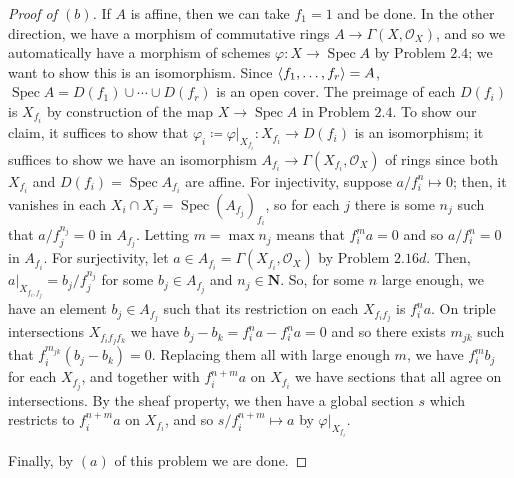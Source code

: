 \documentclass[12pt,letterpaper]{article}
\theoremstyle{definition}
\theoremstyle{remark}
\numberwithin{equation}{section}
\numberwithin{figure}{problem}
\DeclareMathOperator{\Spec}{Spec}
\DeclareMathOperator{\id}{id}
\newcommand{\OO}{\mathcal{O}}
\begin{document}
\begin{proof}[Proof of $(b)$]
  If $A$ is affine, then we can take $f_1 = 1$ and be done. In the other direction, we have a morphism of commutative rings $A \to \Gamma(X,\OO_X)$, and so we automatically have a morphism of schemes $\varphi\colon X \to \Spec A$ by Problem $2.4$; we want to show this is an isomorphism.
  Since $\braket{f_1,\ldots,f_r} = A$, $\Spec A = D(f_1) \cup \cdots \cup D(f_r)$ is an open cover. The preimage of each $D(f_i)$ is $X_{f_i}$ by construction of the map $X \to \Spec A$ in Problem $2.4$. To show our claim, it suffices to show that $\varphi_i \coloneqq \varphi\vert_{X_{f_i}}\colon X_{f_i} \to D(f_i)$ is an isomorphism; it suffices to show we have an isomorphism $A_{f_i} \to \Gamma(X_{f_i},\OO_X)$ of rings since both $X_{f_i}$ and $D(f_i) = \Spec A_{f_i}$ are affine. For injectivity, suppose $a/f_i^n \mapsto 0$; then, it vanishes in each $X_i \cap X_j = \Spec(A_{f_j})_{f_i}$, so for each $j$ there is some $n_j$ such that $a/f_j^{n_j} = 0$ in $A_{f_j}$. Letting $m = \max n_j$ means that $f_i^ma = 0$ and so $a/f_i^n = 0$ in $A_{f_i}$. For surjectivity, let $a \in A_{f_i} = \Gamma(X_{f_i},\OO_X)$ by Problem $2.16d$. Then, $a\vert_{X_{f_i,f_j}} = b_j/f_j^{n_j}$ for some $b_j \in A_{f_j}$ and $n_j \in \mathbf{N}$. So, for some $n$ large enough, we have an element $b_j \in A_{f_j}$ such that its restriction on each $X_{f_if_j}$ is $f_i^{n}a$. On triple intersections $X_{f_if_jf_k}$ we have $b_j - b_k = f_i^na - f_i^na = 0$ and so there exists $m_{jk}$ such that $f_i^{m_{jk}}(b_j-b_k) = 0$. Replacing them all with large enough $m$, we have $f_i^mb_j$ for each $X_{f_j}$, and together with $f_i^{n+m}a$ on $X_{f_i}$ we have sections that all agree on intersections. By the sheaf property, we then have a global section $s$ which restricts to $f_i^{n+m}a$ on $X_{f_i}$, and so $s/f_i^{n+m} \mapsto a$ by $\varphi\vert_{X_{f_i}}$.
  \par Finally, by $(a)$ of this problem we are done.
\end{proof}
\end{document}
